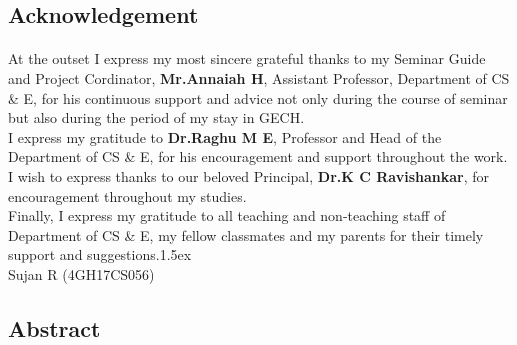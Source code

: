 \documentclass[a4paper,12pt]{report}
\let\origdoublepage\cleardoublepage
\renewcommand{\cleardoublepage}{%
	\clearpage
	{\pagestyle{empty}\origdoublepage}%
}
\begin{document}
	\begin{center}
		\section*{Acknowledgement}
	\end{center}
	\paragraph{}
	\onehalfspacing
	At the outset I express my most sincere grateful thanks to my Seminar Guide and Project Cordinator, 
	\textbf{Mr.Annaiah H}, Assistant Professor, Department of CS \& E,
	for his continuous support and advice not only during the course of  seminar but also during the period of my stay in GECH.\\
	
	\onehalfspacing
I express my gratitude to \textbf{Dr.Raghu M E}, Professor and Head of the Department of CS \& E, for his encouragement and support throughout the	work.\\
	
	\onehalfspacing
	I wish to express thanks to our beloved Principal, \textbf{Dr.K C Ravishankar}, for encouragement throughout my studies.\\
	
	Finally, I express my gratitude to all teaching and non-teaching staff of Department of CS \& E, my fellow classmates and my parents for their	timely support and suggestions.\parskip 1.5ex
	\vspace{1in}\\
	\vspace{1.75mm}
	Sujan R (4GH17CS056)\\
	
	
	
	\cleardoublepage

	
	\tableofcontents
	
	\newpage
	\listoffigures
	\newpage

	\begin{center}
		\section*{Abstract}
	\end{center}
\end{document}
